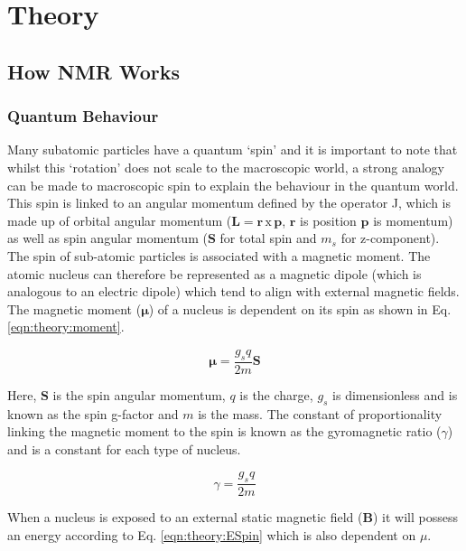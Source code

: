 \chapter{Theory}
\label{Chap:Theory}

\section{How \ac{NMR} Works}
\subsection{Quantum Behaviour}

Many subatomic particles have a quantum `spin' and it is important to note that whilst this `rotation' does not scale to the macroscopic world, a strong analogy can be made to macroscopic spin to explain the behaviour in the quantum world. This spin is linked to an angular momentum defined by the operator J, which is made up of orbital angular momentum ($\mathbf{L} = \mathbf{r}\, \textrm{x} \, \mathbf{p}$, $\mathbf{r}$ is position $\mathbf{p}$ is momentum) as well as spin angular momentum ($\mathbf{S}$ for total spin and $m_s$ for z-component). The spin of sub-atomic particles is associated with a magnetic moment. The atomic nucleus can therefore be represented as a magnetic dipole (which is analogous to an electric dipole) which tend to align with external magnetic fields. The magnetic moment ($\mathbf{\mu}$) of a nucleus is dependent on its spin as shown in Eq. \ref{eqn:theory:moment}.

\begin{equation}
    \mathbf{\mu} = \frac{g_sq}{2m} \mathbf{S}
    \label{eqn:theory:moment}
\end{equation}

Here, $\mathbf{S}$ is the spin angular momentum, $q$ is the charge, $g_s$ is dimensionless and is known as the spin g-factor and $m$ is the mass. The constant of proportionality linking the magnetic moment to the spin is known as the gyromagnetic ratio ($\gamma$) and is a constant for each type of nucleus. 

\begin{equation}
    \gamma = \frac{g_sq}{2m}
    \label{eqn:theory:gyro}
\end{equation}

When a nucleus is exposed to an external static magnetic field ($\mathbf{B}$) it will possess an energy according to Eq. \ref{eqn:theory:ESpin} which is also dependent on $\mu$.

